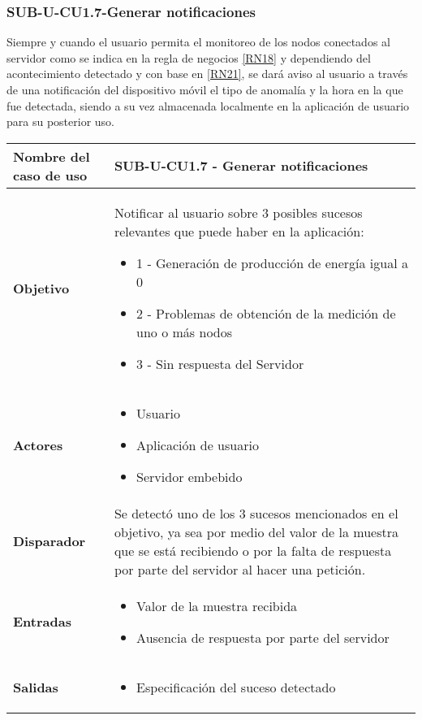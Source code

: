 \subsubsection{SUB-U-CU1.7-Generar notificaciones}\label{SUB-U-CU1.7}
Siempre y cuando el usuario permita el monitoreo de los nodos conectados al servidor como se indica en la regla de negocios \ref{RN18} y dependiendo del acontecimiento detectado y con base en \ref{RN21}, se dará aviso al usuario a través de una notificación del dispositivo móvil el tipo de anomalía y la hora en la que fue detectada, siendo a su vez almacenada localmente en la aplicación de usuario para su posterior uso.  
\begin{longtable}{|J{5cm}|J{10.3cm}|}
	\hline
	\textbf{Nombre del caso de uso} &
		SUB-U-CU1.7 - Generar notificaciones
 \\ \hline
	\textbf{Objetivo} &
		Notificar al usuario sobre 3 posibles sucesos relevantes que puede haber en la aplicación:
		\begin{itemize}
			\item 1 - Generación de producción de energía igual a 0
			\item 2 - Problemas de obtención de la medición de uno o más nodos
			\item 3 - Sin respuesta del Servidor
		\end{itemize} \\ \hline
	\textbf{Actores} &
	    \begin{itemize}
				\item Usuario
				\item Aplicación de usuario 
				\item Servidor embebido
		\end{itemize}
		 \\ \hline 
	\textbf{Disparador} & 
		Se detectó uno de los 3 sucesos mencionados en el objetivo, ya sea por medio del valor de la muestra que se está recibiendo o por la falta de respuesta por parte del servidor al hacer una petición. \\ \hline 
	\textbf{Entradas} & 
		\begin{itemize}
				\item Valor de la muestra recibida
				\item Ausencia de respuesta por parte del servidor
		\end{itemize}\\ \hline 
	\textbf{Salidas} & 
		\begin{itemize}
		    \item Especificación del suceso detectado

\end{itemize}
\end{longtable}

